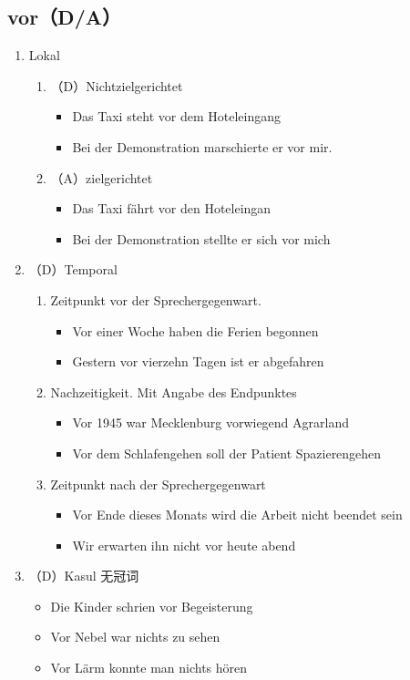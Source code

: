 \documentclass[UTF8]{report}
\begin{document}
\subsection{vor（D/A）}
\begin{enumerate}
    \item Lokal
    \begin{enumerate}
        \item （D）Nichtzielgerichtet
        \begin{itemize}
            \item Das Taxi steht vor dem Hoteleingang
            \item Bei der Demonstration marschierte er vor mir.
        \end{itemize}
        \item （A）zielgerichtet
        \begin{itemize}
            \item Das Taxi fährt vor den Hoteleingan
            \item Bei der Demonstration stellte er sich vor mich
        \end{itemize}
    \end{enumerate}
    \item （D）Temporal
    \begin{enumerate}
        \item Zeitpunkt vor der Sprechergegenwart.
        \begin{itemize}
            \item Vor einer Woche haben die Ferien begonnen
            \item Gestern vor vierzehn Tagen ist er abgefahren
        \end{itemize}
        \item Nachzeitigkeit. Mit Angabe des Endpunktes
        \begin{itemize}
            \item Vor 1945 war Mecklenburg vorwiegend Agrarland
            \item Vor dem Schlafengehen soll der Patient Spazierengehen
        \end{itemize}
        \item Zeitpunkt nach der Sprechergegenwart
        \begin{itemize}
            \item Vor Ende dieses Monats wird die Arbeit nicht beendet sein
            \item Wir erwarten ihn nicht vor heute abend
        \end{itemize}
    \end{enumerate}
    \item（D）Kasul 无冠词
    \begin{itemize}
        \item Die Kinder schrien vor Begeisterung
        \item Vor Nebel war nichts zu sehen
        \item Vor Lärm konnte man nichts hören
    \end{itemize}
\end{enumerate}
\end{document}
